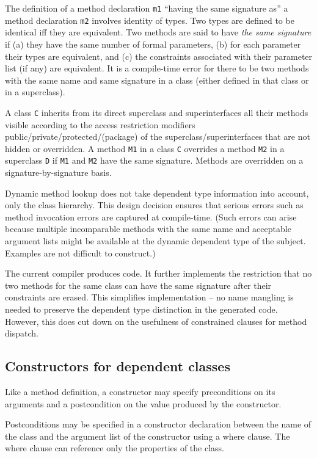 The definition of a method declaration {\tt m1} ``having the same
signature as'' a method declaration {\tt m2} involves identity of
types. Two \Xten{} types are defined to be identical iff they are
equivalent.  Two methods are said to have {\em the same signature} if
(a) they have the same number of formal parameters, (b) for each
parameter their types are equivalent, and (c) the constraints
associated with their parameter list (if any) are equivalent.  It is a
compile-time error for there to be two methods with the same name and
same signature in a class (either defined in that class or in a
superclass).

A class {\tt C} inherits from its direct superclass and
superinterfaces all their methods visible according to the access
restriction modifiers public/private/protected/(package) of the
superclass/superinterfaces that are not hidden or overridden. A method
{\tt M1} in a class {\tt C} overrides a method {\tt M2} in a
superclass {\tt D} if {\tt M1} and {\tt M2} have the same signature.
Methods are overridden on a signature-by-signature basis.

Dynamic method lookup does not take dependent type information into
account, only the class hierarchy. This design decision ensures that
serious errors such as method invocation errors are captured at
compile-time. (Such errors can arise because multiple incomparable
methods with the same name and acceptable argument lists might be
available at the dynamic dependent type of the subject. Examples are
not difficult to construct.)

The current \Xten{} compiler produces \Java{} code. It further
implements the restriction that no two methods for the same class can
have the same signature after their constraints are erased. This
simplifies implementation -- no name mangling is needed to preserve
the dependent type distinction in the generated \Java{} code. However, this does cut down on the usefulness of constrained clauses for method dispatch.

\subsection{Constructors for dependent classes}

Like a method definition,
a constructor may
specify preconditions on its arguments
and a postcondition on the value produced by the constructor.

Postconditions may be specified in a constructor declaration between
the name of the class and the argument list of the constructor using a
where clause. The where clause can reference only the properties of
the class.

